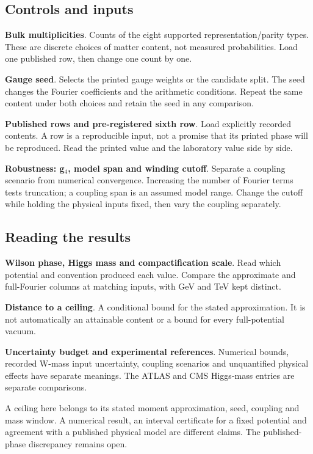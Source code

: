 \documentclass[11pt,a4paper]{article}
\begin{document}
\subsection*{Controls and inputs}
\textbf{Bulk multiplicities}. Counts of the eight supported representation/parity types. These are discrete choices of matter content, not measured probabilities. Load one published row, then change one count by one.

\textbf{Gauge seed}. Selects the printed gauge weights or the candidate split. The seed changes the Fourier coefficients and the arithmetic conditions. Repeat the same content under both choices and retain the seed in any comparison.

\textbf{Published rows and pre-registered sixth row}. Load explicitly recorded contents. A row is a reproducible input, not a promise that its printed phase will be reproduced. Read the printed value and the laboratory value side by side.

\textbf{Robustness: g\ensuremath{{}_{4}}, model span and winding cutoff}. Separate a coupling scenario from numerical convergence. Increasing the number of Fourier terms tests truncation; a coupling span is an assumed model range. Change the cutoff while holding the physical inputs fixed, then vary the coupling separately.

\subsection*{Reading the results}
\textbf{Wilson phase, Higgs mass and compactification scale}. Read which potential and convention produced each value. Compare the approximate and full-Fourier columns at matching inputs, with GeV and TeV kept distinct.

\textbf{Distance to a ceiling}. A conditional bound for the stated approximation. It is not automatically an attainable content or a bound for every full-potential vacuum.

\textbf{Uncertainty budget and experimental references}. Numerical bounds, recorded W-mass input uncertainty, coupling scenarios and unquantified physical effects have separate meanings. The ATLAS and CMS Higgs-mass entries are separate comparisons.

A ceiling here belongs to its stated moment approximation, seed, coupling and mass window. A numerical result, an interval certificate for a fixed potential and agreement with a published physical model are different claims. The published-phase discrepancy remains open.
\end{document}
